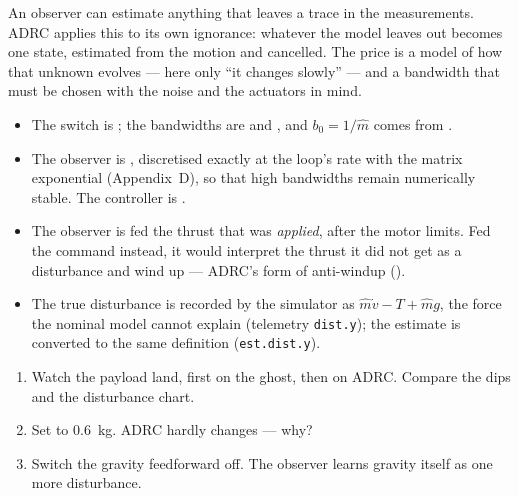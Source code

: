 \begin{keyidea}
An observer can estimate anything that leaves a trace in the measurements. ADRC applies this to its own ignorance: whatever the model leaves out becomes one state, estimated from the motion and cancelled. The price is a model of how that unknown evolves — here only \enquote{it changes slowly} — and a bandwidth that must be chosen with the noise and the actuators in mind.
\end{keyidea}

\begin{inapp}
\begin{itemize}[leftmargin=1.2em]
  \item The switch is ; the bandwidths are  and , and $b_0 = 1/\hat m$ comes from .
  \item The observer is , discretised exactly at the loop's rate with the matrix exponential (Appendix~D), so that high bandwidths remain numerically stable. The controller is .
  \item The observer is fed the thrust that was \emph{applied}, after the motor limits. Fed the command instead, it would interpret the thrust it did not get as a disturbance and wind up — ADRC's form of anti-windup ().
  \item The true disturbance is recorded by the simulator as $\hat m\dot v - T + \hat mg$, the force the nominal model cannot explain (telemetry \texttt{dist.y}); the estimate is converted to the same definition (\texttt{est.dist.y}).
\end{itemize}
\end{inapp}


\begin{trythis}
\begin{enumerate}
  \item Watch the payload land, first on the ghost, then on ADRC. Compare the dips and the disturbance chart.
  \item Set  to \SI{0.6}{kg}. ADRC hardly changes — why?
  \item Switch the gravity feedforward off. The observer learns gravity itself as one more disturbance.
\end{enumerate}
\end{trythis}

